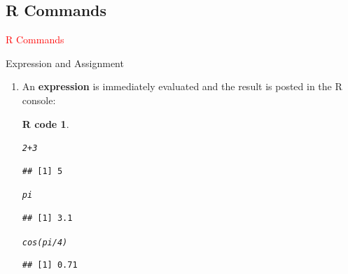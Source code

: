 \documentclass[11pt]{beamer}\usepackage[]{graphicx}\usepackage[]{color}
\makeatletter
\newcommand{\hlnum}[1]{\textcolor[rgb]{0.063,0.58,0.627}{#1}}%
\newcommand{\hlopt}[1]{\textcolor[rgb]{0.196,0.196,0.196}{#1}}%
\newcommand{\hlstd}[1]{\textcolor[rgb]{0.196,0.196,0.196}{#1}}%
\newcommand{\hlkwd}[1]{\textcolor[rgb]{0.78,0.227,0.412}{#1}}%
\newenvironment{kframe}{%
 \def\at@end@of@kframe{}%
 \ifinner\ifhmode%
  \def\at@end@of@kframe{\end{minipage}}%
  \begin{minipage}{\columnwidth}%
 \fi\fi%
 \def\FrameCommand##1{\hskip\@totalleftmargin \hskip-\fboxsep
 \colorbox{shadecolor}{##1}\hskip-\fboxsep
     \hskip-\linewidth \hskip-\@totalleftmargin \hskip\columnwidth}%
 \MakeFramed {\advance\hsize-\width
   \@totalleftmargin\z@ \linewidth\hsize
   \@setminipage}}%
 {\par\unskip\endMakeFramed%
 \at@end@of@kframe}
\newenvironment{knitrout}{}{} %
\newtheorem{rcode}{R code}[section]
\newcounter{saveenumi}
\newcommand{\seti}{\setcounter{saveenumi}{\value{enumi}}}
\makeatother
\begin{document}
\subsection{R Commands}

\begin{frame}
 \begin{center}
  \Huge{\textcolor{red}{R Commands}}
 \end{center}
\end{frame}


\begin{frame}[fragile]{Expression and Assignment} 
\begin{enumerate}
\item An \textbf{expression} is immediately evaluated and the result is posted in the R console:
\pause
\begin{knitrout}
\color{fgcolor}\begin{kframe}
\begin{rcode}\label{unnamed-chunk-22}\begin{alltt}
\hlnum{2} \hlopt{+} \hlnum{3}
\end{alltt}
\begin{verbatim}
## [1] 5
\end{verbatim}
\begin{alltt}
\hlstd{pi}
\end{alltt}
\begin{verbatim}
## [1] 3.1
\end{verbatim}
\begin{alltt}
\hlkwd{cos}\hlstd{(pi}\hlopt{/}\hlnum{4}\hlstd{)}
\end{alltt}
\begin{verbatim}
## [1] 0.71
\end{verbatim}
\end{rcode}\end{kframe}
\end{knitrout}
\seti
\end{enumerate}

\end{frame}
\end{document}
